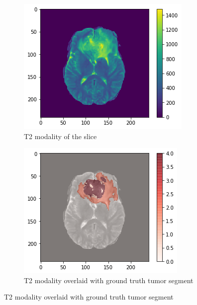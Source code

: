 \begin{figure}[H]
    \centering
    \begin{subfigure}[t]{.32\textwidth}
        \centering
        \includegraphics[width=\linewidth]{chapters/07_brats3d/images/03_t2.png}
        \caption{T2 modality of the slice}
    \end{subfigure}\hfill%
    \begin{subfigure}[t]{.315\textwidth}
        \centering
        \includegraphics[width=\linewidth]{chapters/07_brats3d/images/07_t2_segment.png}
        \caption{T2 modality overlaid with ground truth tumor segment}

\end{subfigure}
\end{figure}
